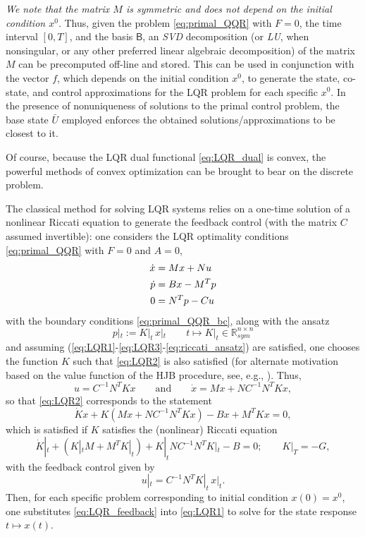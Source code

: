 \documentclass[11pt]{article}
\newcommand{\R}{\mathbb R}
\begin{document}
\emph{We note that the matrix $M$ is symmetric and does not depend on the initial condition $x^0$}. Thus, given the problem \eqref{eq:primal_QQR} with $F= 0$, the time interval $[0,T]$, and the basis $\mathsf{B}$, an \textit{SVD} decomposition (or \textit{LU}, when nonsingular, or any other preferred linear algebraic decomposition)  of the matrix $M$ can be precomputed off-line and stored. This can be used in conjunction with the vector $f$, which depends on the initial condition $x^0$, to generate the state, co-state, and control approximations for the LQR problem for each specific $x^0$. In the presence of nonuniqueness of solutions to the primal control problem, the base state $\bar{U}$ employed enforces the obtained solutions/approximations to be closest to it.

Of course, because the LQR dual functional \eqref{eq:LQR_dual} is convex, the powerful methods of convex optimization \cite{nesterov2018lectures} can be brought to bear on the discrete problem.

The classical method for solving LQR systems relies on a one-time solution of a nonlinear Riccati equation to generate the feedback control (with the matrix $C$ assumed invertible): one considers the LQR optimality conditions \eqref{eq:primal_QQR} with $F= 0$ and $A = 0$,
\begin{subequations}
    \allowdisplaybreaks
    \begin{align}
        \dot{x} & = Mx + Nu \label{eq:LQR1}\\
        \dot{p} & = Bx - M^Tp \label{eq:LQR2}\\
        0 & = N^Tp - Cu \label{eq:LQR3}
    \end{align}
\end{subequations}
with the boundary conditions \eqref{eq:primal_QQR_bc}, along with the ansatz
\begin{equation}\label{eq:riccati_ansatz}
p|_t := K|_t \, x|_t \qquad t \mapsto K|_t \in \R^{n \times n}_{sym}
\end{equation}
and assuming (\ref{eq:LQR1}-\ref{eq:LQR3}-\ref{eq:riccati_ansatz}) are satisfied, one chooses the function $K$ such that \eqref{eq:LQR2} is also satisfied (for alternate motivation based on the value function of the HJB procedure, see, e.g., \cite[Sec.~5.2.3]{evans1983introduction}). Thus,
\[
u = C^{-1}N^TKx \qquad \mbox{and} \qquad \dot{x} = Mx + NC^{-1}N^TKx,
\]
so that \eqref{eq:LQR2} corresponds to the statement
\[
\dot{K}x + K(Mx + NC^{-1}N^TKx) - Bx + M^TKx  = 0,
\]
which is satisfied if $K$ satisfies the (nonlinear) Riccati equation
\[
\dot{K}|_t + (K|_t M + M^T K|_t) + K|_t N C^{-1}N^TK|_t - B = 0; \qquad K|_T = - G,
\]
with the feedback control given by
\begin{equation}\label{eq:LQR_feedback}
u|_t = C^{-1}N^TK|_t \, x|_t.
\end{equation}
Then, for each specific problem corresponding to initial condition $x(0) = x^0$, one substitutes \eqref{eq:LQR_feedback} into \eqref{eq:LQR1} to solve for the state response $t \mapsto x(t)$.
\end{document}
